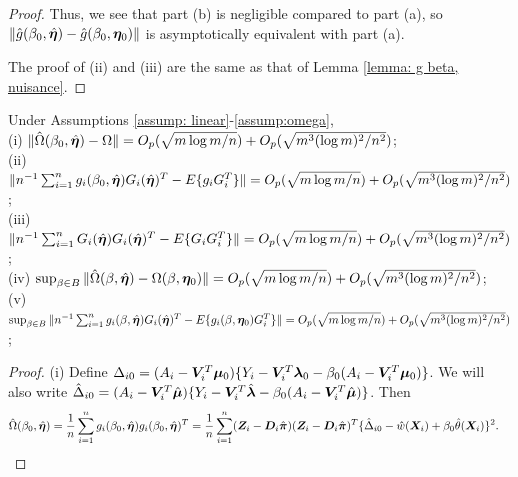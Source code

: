 \documentclass[12pt]{article}
\begin{document}
{{\begin{proof}
Thus, we see that part (b) is negligible compared to part (a), so  $\|\hat g(\beta_0, \hat{\bm \eta}) -\hat g(\beta_0, \bm \eta_0) \|$  is asymptotically equivalent with part (a).                         

The proof of (ii) and (iii) are the same as that of Lemma \ref{lemma: g beta, nuisance}.                        
        
                                                                                                                                                                      
\end{proof}
}


\begin{lemma} \label{lemma: Omega eta hat}
	  Under Assumptions    \ref{assump: linear}-\ref{assump:omega},   \\
	  (i) $ \|\hat\Omega(\beta_0,\hat {\bm \eta})- \Omega \| =O_p(\sqrt{m\log m/n}) + O_p(\sqrt{m^3(\log m)^2/n^2})$; \\
	  (ii) $   \|n^{-1} \sum_{i=1}^{n}g_i(\beta_0,\hat {\bm \eta}) G_i(\hat{\bm \eta})^T - E\{g_i G_i^T\} \|=O_p(\sqrt{m\log m/n}) + O_p(\sqrt{m^3(\log m)^2/n^2})$; \\
	  	  (iii) $    \|n^{-1} \sum_{i=1}^{n}G_i(\hat {\bm \eta}) G_i(\hat{\bm \eta})^T - E\{G_i G_i^T\} \| =O_p(\sqrt{m\log m/n}) + O_p(\sqrt{m^3(\log m)^2/n^2})$; \\ 
	  	  (iv) $ 	\sup_{\beta\in B} \|\hat\Omega(\beta,\hat {\bm \eta})- \Omega(\beta, \bm \eta_0)\| =O_p(\sqrt{m\log m/n}) + O_p(\sqrt{m^3(\log m)^2/n^2})$; \\
	  	 (v) $ 	\sup_{\beta\in B}  \|n^{-1} \sum_{i=1}^{n}g_i(\beta,\hat {\bm \eta}) G_i(\hat{\bm \eta})^T - E\{g_i(\beta,\bm \eta_0) G_i^T\} \| =O_p(\sqrt{m\log m/n}) + O_p(\sqrt{m^3(\log m)^2/n^2})$; \\
\end{lemma}
\begin{proof}
	(i)
Define $ \Delta_{i0}= ( A_i- \bm{V}_i^T \bm\mu_0 )\{ Y_i- \bm{V}_i^T \bm{\lambda}_{0} - \beta_0( A_i- \bm{V}_i^T \bm \mu_0 ) \}$. We will also write $ \hat \Delta_{i0}= ( A_i- \bm{V}_i^T \hat{\bm\mu} )\{ Y_i- \bm{V}_i^T \hat{\bm{\lambda}} - \beta_0( A_i- \bm{V}_i^T \hat{\bm \mu} ) \}$. Then 
\begin{align*}
&\hat	\Omega (\beta_0,\hat{\bm \eta}) = \frac{1}{n} \sum_{i=1}^{n} g_i(\beta_0,\hat{\bm \eta}) g_i(\beta_0,\hat{\bm \eta})^T  =   \frac{1}{n} \sum_{i=1}^{n} (\bm{Z}_i - \bm D_i \hat{\bm\pi}) (\bm{Z}_i - \bm D_i \hat{\bm\pi})^T \{\hat\Delta_{i0} - \hat w(\bm{X}_i) + \beta_0 \hat \theta(\bm{X}_i)\}^2.
\end{align*} 

\end{proof}}
\end{document}
